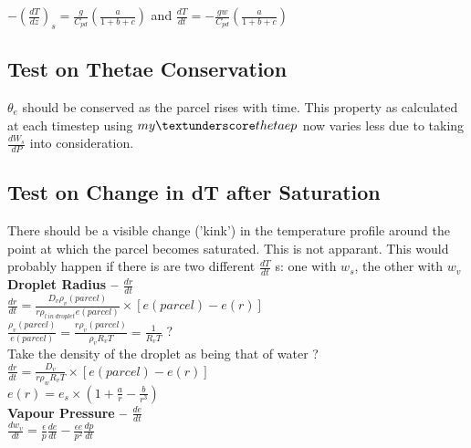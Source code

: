 \documentclass[11pt]{article} %
\begin{document}
$-(\frac{dT}{dz})_{s} = \frac{g}{C_{pd}}(\frac{a}{1 + b + c})$ and $\frac{dT}{dt} = -\frac{gw}{C_{pd}}(\frac{a}{1 + b + c})$\\

\subsection{Test on Thetae Conservation}

$\theta_{e}$ should be conserved as the parcel rises with time. This property as calculated at each timestep using $my \textunderscore thetaep$ 
now varies less due to taking $\frac{dW_{s}}{dP}$ into consideration.\\

\subsection{Test on Change in dT after Saturation}

There should be a visible change ('kink') in the temperature profile around the point at which the parcel becomes saturated.  This is not apparant.  This would probably happen if there is are two different $\frac{dT}{dt}$ s: one with $w_{s}$, the other with $w_{v}$\\

{\bf Droplet Radius -- $\frac{dr}{dt}$} \\

$\frac{dr}{dt} = \frac{D_{v}\rho_{v}(parcel)}{r \rho_{l \ in \ droplet}e(parcel)} \times [e(parcel) - e(r)]$\\

$\frac{\rho_{v}(parcel)}{e(parcel)} = \frac{ r \rho_{v}(parcel)}{\rho_{v}R_{v}T} = \frac{1}{R_{v}T}$ ?\\

Take the density of the droplet as being that of water ?\\

$\frac{dr}{dt} = \frac{D_{v}}{r \rho_{w}R_{v}T} \times [e(parcel) - e(r)]$\\

$e(r) = e_{s} \times \left(1 + \frac{a}{r} - \frac{b}{r^{3}} \right) $\\

{\bf Vapour Pressure -- $\frac{de}{dt}$}\\

$\frac{dw_{v}}{dt} = \frac{\epsilon}{p} \frac{de}{dt} - \frac{\epsilon e}{p^{2}}\frac{dp}{dt}$\\
\end{document}
